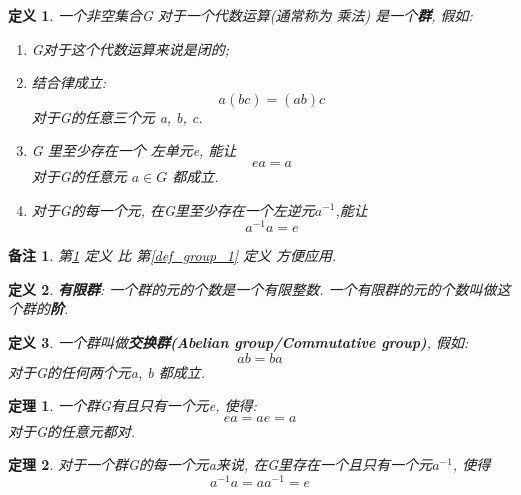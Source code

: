 \documentclass[utf8]{ctexbook}
\newtheorem{theorem}{定理}[section]
\newtheorem{definition}{定义}[section]
\newtheorem{memo}{备注}[section]
\begin{document}
\begin{definition}\label{def_group_2}
一个非空集合G 对于一个代数运算(通常称为 乘法) 是一个\textbf{群}, 假如:
\begin{enumerate}
\item[I.]{G对于这个代数运算来说是闭的;}
\item[II.]{结合律成立:
	\begin{equation}
		a(bc) = (ab) c 	
	\end{equation}
对于G的任意三个元 a, b, c.}
\item[IV.]{G 里至少存在一个 左单元e, 能让
\begin{equation}
ea = a
\end{equation}
对于G的任意元 $a \in G$ 都成立.
}
\item[V.]{对于G的每一个元, 在G里至少存在一个左逆元$a^{-1}$,能让
\begin{equation}
	a^{-1} a = e
\end{equation}
}
\end{enumerate}
\end{definition}

\begin{memo}
第\ref{def_group_2} 定义 比 第\ref{def_group_1} 定义 方便应用.
\end{memo}

\begin{definition}
\textbf{有限群}: 一个群的元的个数是一个有限整数. 一个有限群的元的个数叫做这个群的\textbf{阶}.
\end{definition}

\begin{definition}
一个群叫做\textbf{交换群(Abelian group/Commutative group)}, 假如:
\begin{equation}
ab= ba
\end{equation}
对于G的任何两个元a, b 都成立.
\end{definition}

\begin{theorem}
一个群G有且只有一个元e, 使得:
\begin{equation}
ea = ae = a
\end{equation}
对于G的任意元都对.
\end{theorem}

\begin{theorem}
对于一个群G的每一个元a来说, 在G里存在一个且只有一个元$a^{-1}$, 使得
\begin{equation}
a^{-1} a = a a^{-1} = e
\end{equation}
\end{theorem}
\end{document}
